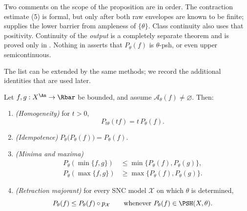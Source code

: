Two comments on the scope of the proposition are in order.  The contraction
estimate (5) is formal, but only after both raw envelopes are known to be
finite;  supplies the lower barrier
from ampleness of $\{\theta\}$.  Class continuity also uses that positivity.
Continuity of the
\emph{output} is a completely separate theorem and is proved only in
.  Nothing in
 asserts that $P_\theta(f)$ is
$\theta$-psh, or even upper semicontinuous.

The list can be extended by the same methods; we record the additional
identities that are used later.

\begin{proposition}
\label{prop:ch23-further-calculus}
Let $f,g:X^{\An}\to\Rbar$ be bounded, and assume
$\mathcal A_\theta(f)\ne\varnothing$.  Then:
\begin{enumerate}
\item \emph{(Homogeneity)} for $t>0$,
\begin{equation}\label{eq:ch23-homogeneity}
 P_{t\theta}(tf)=t\,P_\theta(f).
\end{equation}
\item \emph{(Idempotence)} $P_\theta\bigl(P_\theta(f)\bigr)=P_\theta(f)$.
\item \emph{(Minima and maxima)}
\begin{equation}\label{eq:ch23-min-max}
 \begin{aligned}
 P_\theta(\min\{f,g\})&\leq\min\{P_\theta(f),P_\theta(g)\},\\
 P_\theta(\max\{f,g\})&\geq\max\{P_\theta(f),P_\theta(g)\}.
 \end{aligned}
\end{equation}
\item \emph{(Retraction majorant)} for every SNC model $\mathcal X$ on
which $\theta$ is determined,
\begin{equation}\label{eq:ch23-envelope-retraction-bound}
 P_\theta(f)\leq P_\theta(f)\circ p_{\mathcal X}
 \qquad\text{whenever }P_\theta(f)\in\PSH(X,\theta).
\end{equation}
\end{enumerate}
\end{proposition}

